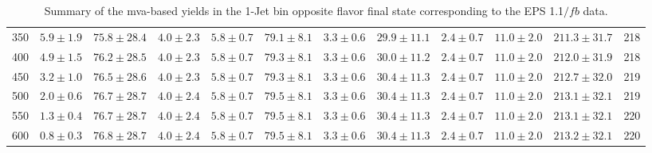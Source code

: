 \begin{table}
{\begin{center}
\begin{tabular}{l c c c c c c c c c c c }
350 & $5.9\pm1.9$ & $75.8\pm28.4$ & $4.0\pm2.3$ & $5.8\pm0.7$ & $79.1\pm8.1$ & $3.3\pm0.6$ & $29.9\pm11.1$ & $2.4\pm0.7$ & $11.0\pm2.0$ & $211.3\pm31.7$ & 218 \\
400 & $4.9\pm1.5$ & $76.2\pm28.5$ & $4.0\pm2.3$ & $5.8\pm0.7$ & $79.3\pm8.1$ & $3.3\pm0.6$ & $30.0\pm11.2$ & $2.4\pm0.7$ & $11.0\pm2.0$ & $212.0\pm31.9$ & 218 \\
450 & $3.2\pm1.0$ & $76.5\pm28.6$ & $4.0\pm2.3$ & $5.8\pm0.7$ & $79.3\pm8.1$ & $3.3\pm0.6$ & $30.4\pm11.3$ & $2.4\pm0.7$ & $11.0\pm2.0$ & $212.7\pm32.0$ & 219 \\
500 & $2.0\pm0.6$ & $76.7\pm28.7$ & $4.0\pm2.4$ & $5.8\pm0.7$ & $79.5\pm8.1$ & $3.3\pm0.6$ & $30.4\pm11.3$ & $2.4\pm0.7$ & $11.0\pm2.0$ & $213.1\pm32.1$ & 219 \\
550 & $1.3\pm0.4$ & $76.7\pm28.7$ & $4.0\pm2.4$ & $5.8\pm0.7$ & $79.5\pm8.1$ & $3.3\pm0.6$ & $30.4\pm11.3$ & $2.4\pm0.7$ & $11.0\pm2.0$ & $213.1\pm32.1$ & 220 \\
600 & $0.8\pm0.3$ & $76.8\pm28.7$ & $4.0\pm2.4$ & $5.8\pm0.7$ & $79.5\pm8.1$ & $3.3\pm0.6$ & $30.4\pm11.3$ & $2.4\pm0.7$ & $11.0\pm2.0$ & $213.2\pm32.1$ & 220 \\
\hline
\end{tabular}
\end{center}
}
\caption{Summary of the mva-based yields in the 1-Jet bin opposite flavor final state corresponding to the EPS 1.1$/fb$ data.}
\end{table}
